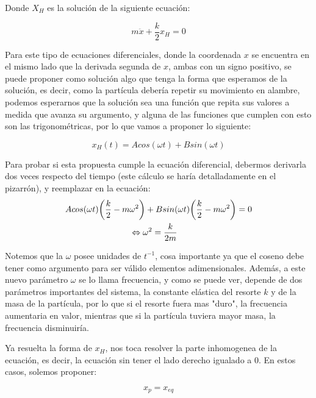 \documentclass{article}
\begin{document}
\begin{multicols}{2}
Donde $X_H$ es la solución de la siguiente ecuación:

\begin{equation}
    m\ddot{x} + \frac{k}{2}x_H = 0
\end{equation}

Para este tipo de ecuaciones diferenciales, donde la coordenada $x$ se encuentra en el mismo lado que la derivada segunda de $x$, ambas con un signo positivo, se puede proponer como solución algo que tenga la forma que esperamos de la solución, es decir, como la partícula debería repetir su movimiento en alambre, podemos esperarnos que la solución sea una función que repita sus valores a medida que avanza su argumento, y alguna de las funciones que cumplen con esto son las trigonométricas, por lo que vamos a proponer lo siguiente:

\begin{equation}
    x_H(t) = Acos(\omega t) + Bsin(\omega t)
\end{equation}

Para probar si esta propuesta cumple la ecuación diferencial, debermos derivarla dos veces respecto del tiempo (este cálculo se haría detalladamente en el pizarrón), y reemplazar en la ecuación:
\begin{equation}
    \centering
    \begin{split}
        Acos(\omega t) \bigg(\frac{k}{2} - m&\omega^2 \bigg) + Bsin(\omega t)\bigg( \frac{k}{2} - m\omega^2 \bigg) = 0 \\
        &\Leftrightarrow \omega^2 = \frac{k}{2m}
    \end{split}
\end{equation}

Notemos que la $\omega$ posee unidades de $t^{-1}$, cosa importante ya que el coseno debe tener como argumento para ser válido elementos adimensionales. Además, a este nuevo parámetro $\omega$ se lo llama frecuencia, y como se puede ver, depende de dos parámetros importantes del sistema, la constante elástica del resorte $k$ y de la masa de la partícula, por lo que si el resorte fuera mas "duro", la frecuencia aumentaria en valor, mientras que si la partícula tuviera mayor masa, la frecuencia disminuiría.

Ya resuelta la forma de $x_H$, nos toca resolver la parte inhomogenea de la ecuación, es decir, la ecuación sin tener el lado derecho igualado a $0$. En estos casos, solemos proponer:

\begin{equation}
    x_p = x_{eq}
\end{equation}


\end{multicols}
\end{document}
